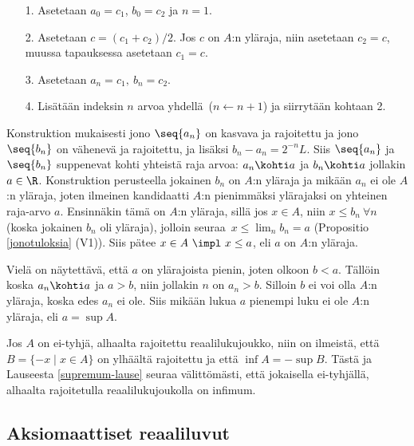 \begin{itemize}
\item[1.] Asetetaan $a_0=c_1$, $b_0=c_2$ ja $n=1$.
\item[2.] Asetetaan $c = (c_1 + c_2)/2$. Jos $c$ on $A$:n yläraja, niin asetetaan $c_2=c$,
          muussa tapauksessa asetetaan $c_1=c$. 
\item[3.] Asetetaan $a_n=c_1,\ b_n=c_2$.
\item[4.] Lisätään indeksin $n$ arvoa yhdellä\ ($n \leftarrow n+1$) ja siirrytään kohtaan 2.
\end{itemize}
Konstruktion mukaisesti jono $\seq{a_n}$ on kasvava ja rajoitettu ja jono $\seq{b_n}$ on
vähenevä ja rajoitettu, ja lisäksi $b_n-a_n=2^{-n}L$. Siis $\seq{a_n}$ ja $\seq{b_n}$
suppenevat kohti yhteistä raja arvoa: $a_n \kohti a$ ja $b_n \kohti a$ jollakin $a\in\R$.
Konstruktion perusteella jokainen $b_n$ on $A$:n yläraja ja mikään $a_n$ ei ole $A$:n yläraja,
joten ilmeinen kandidaatti $A$:n pienimmäksi ylärajaksi on yhteinen raja-arvo $a$. Ensinnäkin
tämä on $A$:n yläraja, sillä jos $x \in A$, niin $x \le b_n\ \forall n$ (koska jokainen $b_n$ 
oli yläraja), jolloin seuraa $\,x \le \lim_n b_n=a$ (Propositio \ref{jonotuloksia} (V1)).
Siis pätee $x \in A\ \impl\ x \le a$, eli $a$ on $A$:n yläraja.

Vielä on näytettävä, että $a$ on ylärajoista pienin, joten olkoon $b<a$. Tällöin koska 
$a_n \kohti a$ ja $a>b$, niin jollakin $n$ on $a_n>b$. Silloin $b$ ei voi olla $A$:n yläraja, 
koska edes $a_n$ ei ole. Siis mikään lukua $a$ pienempi luku ei ole $A$:n yläraja, eli 
$a=\sup A$. \loppu

Jos $A$ on ei-tyhjä, alhaalta rajoitettu reaalilukujoukko, niin on ilmeistä, että 
$B = \{-x \mid x \in A\}$ on ylhäältä rajoitettu ja että $\inf A = - \sup B$. Tästä ja 
Lauseesta \ref{supremum-lause} seuraa välittömästi, että jokaisella ei-tyhjällä, alhaalta 
rajoitetulla reaalilukujoukolla on infimum.

\subsection{Aksiomaattiset reaaliluvut}

